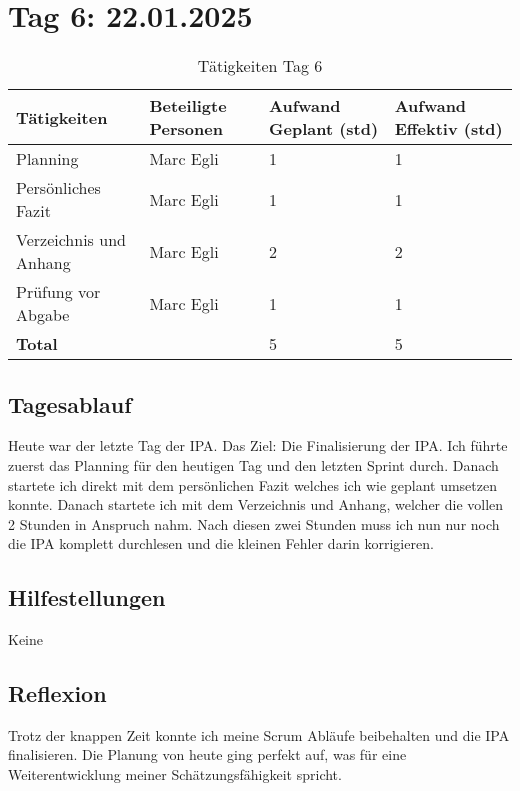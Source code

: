 \section{Tag 6: 22.01.2025}
\begin{table}[H]
    \begin{tabular}{|L{0.4\textwidth}|C{60pt}|C{60pt}|C{60pt}|}
        \hline
        \color{white}Tätigkeiten & \color{white}Beteiligte \color{white}Personen & \color{white}Aufwand Geplant (std) & \color{white}Aufwand Effektiv (std) \\
        \hline
        Planning & Marc Egli & 1 & 1 \\
        \hline
        Persönliches Fazit & Marc Egli & 1 & 1 \\
        \hline
        Verzeichnis und Anhang & Marc Egli & 2 & 2 \\
        \hline
        Prüfung vor Abgabe & Marc Egli & 1 & 1 \\
        \hline
        \textbf{Total} & & 5 &5 \\
        \hline
    \end{tabular}
    \caption{Tätigkeiten Tag 6}
\end{table}

\subsection*{Tagesablauf}
Heute war der letzte Tag der IPA. Das Ziel: Die Finalisierung der IPA. Ich führte zuerst das Planning für den heutigen Tag und
den letzten Sprint durch. Danach startete ich direkt mit dem persönlichen Fazit welches ich wie geplant umsetzen konnte.
Danach startete ich mit dem Verzeichnis und Anhang, welcher die vollen 2 Stunden in Anspruch nahm. Nach diesen zwei Stunden muss ich nun 
nur noch die IPA komplett durchlesen und die kleinen Fehler darin korrigieren.

\subsection*{Hilfestellungen}

Keine 

\subsection*{Reflexion}
Trotz der knappen Zeit konnte ich meine Scrum Abläufe beibehalten und die IPA finalisieren. Die Planung von heute
ging perfekt auf, was für eine Weiterentwicklung meiner Schätzungsfähigkeit spricht. 

